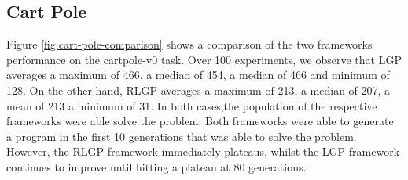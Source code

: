 \documentclass[12pt, final]{dalcsthesis}
\begin{document}
\subsection{Cart Pole}

Figure \ref{fig:cart-pole-comparison} shows a comparison of the two frameworks performance on the cartpole-v0 task. Over 100 experiments, we observe that LGP averages a maximum of 466, a median of 454, a median of 466 and minimum of 128. On the other hand, RLGP
averages a maximum of 213, a median of 207, a mean of 213 a minimum of 31. In both cases,the population of the respective frameworks were able solve the problem. Both frameworks were able
to generate a program in the first 10 generations that was able to solve the problem. However, the RLGP framework immediately plateaus, whilst the LGP framework continues to improve until hitting a plateau at 80 generations.
\end{document}
